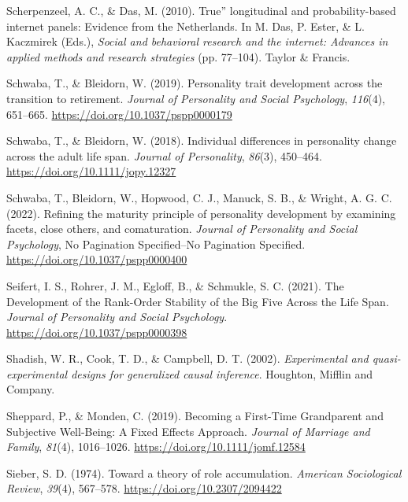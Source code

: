 \documentclass[
  english,
  man,floatsintext]{apa7}
\begin{document}
\leavevmode\hypertarget{ref-scherpenzeelTrueLongitudinalProbabilitybased2010}{}%
Scherpenzeel, A. C., \& Das, M. (2010). True'' longitudinal and probability-based internet panels: Evidence from the Netherlands. In M. Das, P. Ester, \& L. Kaczmirek (Eds.), \emph{Social and behavioral research and the internet: Advances in applied methods and research strategies} (pp. 77--104). Taylor \& Francis.

\leavevmode\hypertarget{ref-schwabaPersonalityTraitDevelopment2019}{}%
Schwaba, T., \& Bleidorn, W. (2019). Personality trait development across the transition to retirement. \emph{Journal of Personality and Social Psychology}, \emph{116}(4), 651--665. \url{https://doi.org/10.1037/pspp0000179}

\leavevmode\hypertarget{ref-schwabaIndividualDifferencesPersonality2018}{}%
Schwaba, T., \& Bleidorn, W. (2018). Individual differences in personality change across the adult life span. \emph{Journal of Personality}, \emph{86}(3), 450--464. \url{https://doi.org/10.1111/jopy.12327}

\leavevmode\hypertarget{ref-schwabaRefiningMaturityPrinciple2022}{}%
Schwaba, T., Bleidorn, W., Hopwood, C. J., Manuck, S. B., \& Wright, A. G. C. (2022). Refining the maturity principle of personality development by examining facets, close others, and comaturation. \emph{Journal of Personality and Social Psychology}, No Pagination Specified--No Pagination Specified. \url{https://doi.org/10.1037/pspp0000400}

\leavevmode\hypertarget{ref-seifertDevelopmentRankOrderStability2021}{}%
Seifert, I. S., Rohrer, J. M., Egloff, B., \& Schmukle, S. C. (2021). The Development of the Rank-Order Stability of the Big Five Across the Life Span. \emph{Journal of Personality and Social Psychology}. \url{https://doi.org/10.1037/pspp0000398}

\leavevmode\hypertarget{ref-shadishExperimentalQuasiexperimentalDesigns2002}{}%
Shadish, W. R., Cook, T. D., \& Campbell, D. T. (2002). \emph{Experimental and quasi-experimental designs for generalized causal inference}. Houghton, Mifflin and Company.

\leavevmode\hypertarget{ref-sheppardBecomingFirstTimeGrandparent2019}{}%
Sheppard, P., \& Monden, C. (2019). Becoming a First-Time Grandparent and Subjective Well-Being: A Fixed Effects Approach. \emph{Journal of Marriage and Family}, \emph{81}(4), 1016--1026. \url{https://doi.org/10.1111/jomf.12584}

\leavevmode\hypertarget{ref-sieberTheoryRoleAccumulation1974}{}%
Sieber, S. D. (1974). Toward a theory of role accumulation. \emph{American Sociological Review}, \emph{39}(4), 567--578. \url{https://doi.org/10.2307/2094422}
\end{document}
